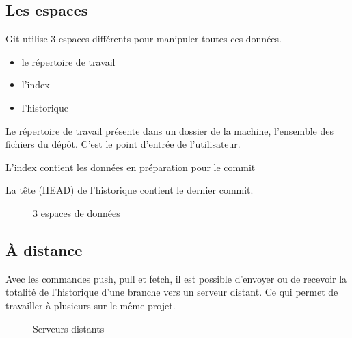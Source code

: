 \documentclass[a4paper]{article}
\begin{document}
\subsection*{Les espaces}
Git utilise 3 espaces différents pour manipuler toutes ces données.
\begin{itemize}
\item le répertoire de travail
\item l'index
\item l'historique
\end{itemize}

Le répertoire de travail présente dans un dossier de la machine, l'ensemble des fichiers du dépôt. C'est le point d'entrée de l'utilisateur.

L'index contient les données en préparation pour le commit

La tête (HEAD) de l'historique contient le dernier commit.

\begin{figure}[h]
  \center
  \caption{3 espaces de données}
\end{figure}

\subsection*{À distance}
Avec les commandes push, pull et fetch, il est possible d'envoyer ou de recevoir la totalité de l'historique d'une branche vers un serveur distant. Ce qui permet de travailler à plusieurs sur le même projet.

\vspace{2mm}

\begin{figure}[h]
  \center
  \caption{Serveurs distants}
\end{figure}
\end{document}
